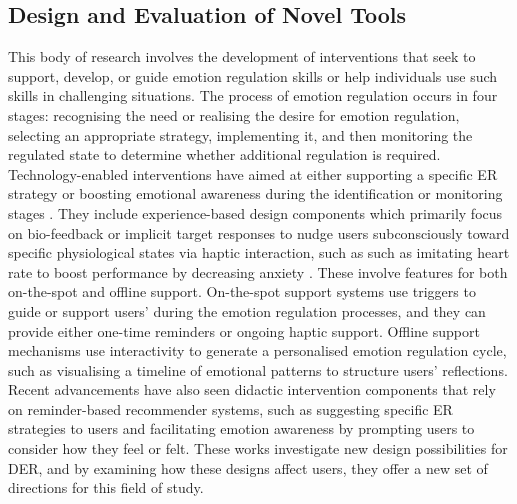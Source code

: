 \documentclass[lettersize,journal]{IEEEtran}
\begin{document}
\subsection{Design and Evaluation of Novel Tools}
This body of research involves the development of interventions that seek to support, develop, or guide emotion regulation skills or help individuals use such skills in challenging situations. The process of emotion regulation occurs in four stages: recognising the need or realising the desire for emotion regulation, selecting an appropriate strategy, implementing it, and then monitoring the regulated state to determine whether additional regulation is required. Technology-enabled interventions have aimed at either supporting a specific ER strategy or boosting emotional awareness during the identification or monitoring stages \cite{slovak2022designing}. They include experience-based design components which primarily focus on bio-feedback or implicit target responses to nudge users subconsciously toward specific physiological states via haptic interaction, such as such as imitating heart rate to boost performance by decreasing anxiety \cite{smith2022digital}. These involve features for both on-the-spot and offline support. On-the-spot support systems use triggers to guide or support users' during the emotion regulation processes, and they can provide either one-time reminders or ongoing haptic support. Offline support mechanisms use interactivity to generate a personalised emotion regulation cycle, such as visualising a timeline of emotional patterns to structure users' reflections. Recent advancements have also seen didactic intervention components that rely on reminder-based recommender systems, such as suggesting specific ER strategies to users and facilitating emotion awareness by prompting users to consider how they feel or felt. These works investigate new design possibilities for DER, and by examining how these designs affect users, they offer a new set of directions for this field of study.
\end{document}
